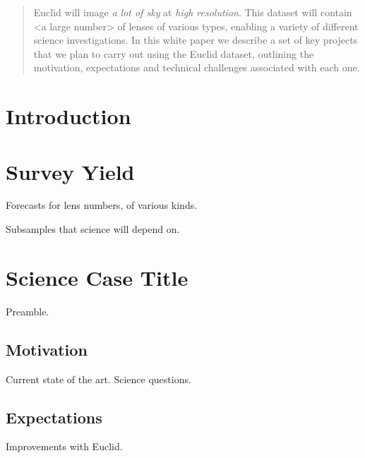 \documentclass{article}
\begin{document}



\begin{abstract}
Euclid will image \emph{a lot of sky} at \emph{high resolution}. This dataset will
contain <a large number> of lenses of various types, enabling a variety of
different  science investigations. In this white paper we describe a set of key
projects that we plan to carry out using the Euclid dataset, outlining the
motivation, expectations and technical challenges associated with each one.
\end{abstract}


\section{Introduction}



\section{Survey Yield}

Forecasts for lens numbers, of various kinds. 

Subsamples that science will depend on.



\section{Science Case Title}

Preamble.

\subsection{Motivation}

Current state of the art. Science questions.

\subsection{Expectations}

Improvements with Euclid.
\end{document}
